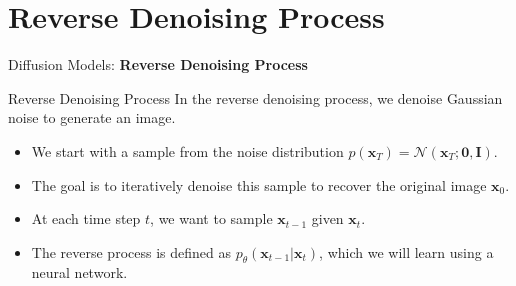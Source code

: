 \section{Reverse Denoising Process}
\begin{frame}{}
    \LARGE Diffusion Models: \textbf{Reverse Denoising Process}
\end{frame}

\begin{frame}{Reverse Denoising Process}
    In the reverse denoising process, we denoise Gaussian noise to generate an image.
    \begin{itemize}
        \item<2-> We start with a sample from the noise distribution $p(\mathbf{x}_T) = \mathcal{N}(\mathbf{x}_T; \mathbf{0}, \mathbf{I})$.
        \item<3-> The goal is to iteratively denoise this sample to recover the original image $\mathbf{x}_0$.
        \item<4-> At each time step $t$, we want to sample $\mathbf{x}_{t-1}$ given $\mathbf{x}_t$.
        \item<5-> The reverse process is defined as $p_\theta(\mathbf{x}_{t-1}|\mathbf{x}_t)$, which we will learn using a neural network.
    \end{itemize}
\end{frame}


